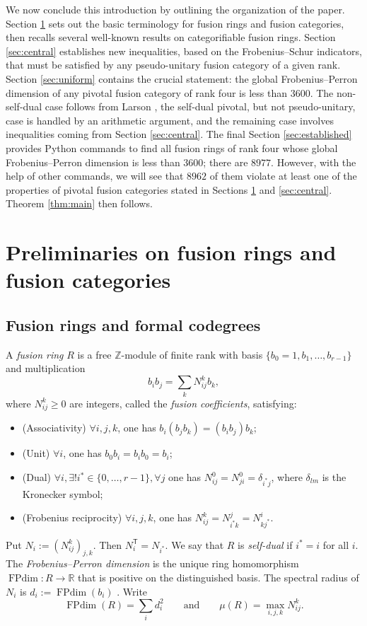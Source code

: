 \documentclass[11pt]{amsart}
\theoremstyle{definition}
\DeclareMathOperator{\FPdim}{FPdim}
\newcommand{\Z}{\mathbb Z}
\numberwithin{equation}{section}
\begin{document}
We now conclude this introduction by outlining the organization of the paper. 
Section \ref{sec:spherical} sets out the basic terminology for fusion rings and fusion categories, then recalls several well-known results on categorifiable fusion rings. 
Section \ref{sec:central} establishes new inequalities, based on the Frobenius--Schur indicators, that must be satisfied by any pseudo-unitary fusion category of a given rank. 
Section \ref{sec:uniform} contains the crucial statement: the global Frobenius--Perron dimension of any pivotal fusion category of rank four is less than $3600$. 
The non-self-dual case follows from Larson \cite{Larson}, the self-dual pivotal, but not pseudo-unitary, case is handled by an arithmetic argument, and the remaining case involves inequalities coming from Section \ref{sec:central}.
The final Section \ref{sec:established} provides Python commands to find all fusion rings of rank four whose global Frobenius--Perron dimension is less than $3600$; there are $8977$. 
However, with the help of other commands, we will see that $8962$ of them violate at least one of the properties of pivotal fusion categories stated in Sections \ref{sec:spherical} and \ref{sec:central}. Theorem \ref{thm:main} then follows. 

\section{Preliminaries on fusion rings and fusion categories}\label{sec:spherical}

\subsection{Fusion rings and formal codegrees}
A \textit{fusion ring} $R$ is a free $\Z$-module of finite rank with basis $\{b_0=1, b_1,\dots, b_{r-1}\}$ and multiplication \[
 b_ib_j=\sum_kN_{ij}^kb_k,\] where $N_{ij}^k\geq 0$ are integers, called the \textit{fusion coefficients}, satisfying:  
\begin{itemize}
\item (Associativity) $\forall i,j,k$, one has $b_i(b_jb_k)=(b_ib_j)b_k$; 
\item (Unit) $\forall i$, one has $b_0 b_i=b_ib_0=b_i$; 
\item (Dual) $\forall i, \exists! i^*\in\{0,\dots,r-1\}, \forall j$ one has $N^{0}_{ij}=N^0_{ji}=\delta_{i^*j}$, where $\delta_{lm}$ is the Kronecker symbol; 
\item (Frobenius reciprocity) $\forall i,j,k$, one has $N^k_{ij}=N^j_{i^*k}=N^i_{kj^*}$. 
\end{itemize}
Put $N_i:=(N_{ij}^k)_{j,k}$. Then $N_i^{\mathsf T}=N_{i^*}$. 
We say that $R$ is \textit{self-dual} if $i^*=i$ for all $i$. 
The \textit{Frobenius--Perron dimension} is the unique ring homomorphism $\FPdim:R\to\mathbb R$ that is positive on the distinguished basis. 
The spectral radius of $N_i$ is $d_i:=\FPdim(b_i)$ \cite[Theorem~8.2 and Lemma~8.3]{ENO}.
Write
\[
 \FPdim(R)=\sum_i d_i^2 \qquad \text{and} \qquad \mu(R)=\max_{i,j,k}N_{ij}^k.
\]
\end{document}
